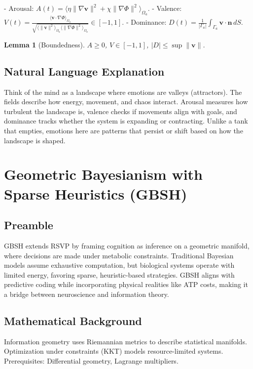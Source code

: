 \documentclass[11pt]{article}
\theoremstyle{plain}
\newtheorem{lemma}{Lemma}
\begin{document}
- Arousal: \(A(t) = \langle \eta \|\nabla \mathbf{v}\|^2 + \chi \|\nabla \Phi\|^2 \rangle_{\Omega_a}\).
- Valence: \(V(t) = \frac{\langle \mathbf{v} \cdot \nabla \Phi \rangle_{\Omega_a}}{\sqrt{\langle \|\mathbf{v}\|^2 \rangle_{\Omega_a} \langle \|\nabla \Phi\|^2 \rangle_{\Omega_a}}} \in [-1, 1]\).
- Dominance: \(D(t) = \frac{1}{|\Gamma_a|} \int_{\Gamma_a} \mathbf{v} \cdot \mathbf{n} \, dS\).

\begin{lemma}[Boundedness]
\(A \geq 0\), \(V \in [-1, 1]\), \(|D| \leq \sup \|\mathbf{v}\|\).
\end{lemma}

\subsection{Natural Language Explanation}
Think of the mind as a landscape where emotions are valleys (attractors). The fields describe how energy, movement, and chaos interact. Arousal measures how turbulent the landscape is, valence checks if movements align with goals, and dominance tracks whether the system is expanding or contracting. Unlike a tank that empties, emotions here are patterns that persist or shift based on how the landscape is shaped.

\section{Geometric Bayesianism with Sparse Heuristics (GBSH)}

\subsection{Preamble}
GBSH extends RSVP by framing cognition as inference on a geometric manifold, where decisions are made under metabolic constraints. Traditional Bayesian models assume exhaustive computation, but biological systems operate with limited energy, favoring sparse, heuristic-based strategies. GBSH aligns with predictive coding while incorporating physical realities like ATP costs, making it a bridge between neuroscience and information theory.

\subsection{Mathematical Background}
Information geometry uses Riemannian metrics to describe statistical manifolds. Optimization under constraints (KKT) models resource-limited systems. Prerequisites: Differential geometry, Lagrange multipliers.
\end{document}
